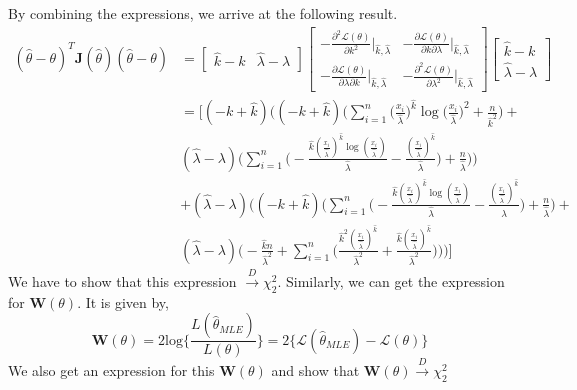 \documentclass[11pt]{article}
\begin{document}
By combining the expressions, we arrive at the following result.
\begin{equation}
  \nonumber
  \begin{aligned}
    (\hat{\theta} - \theta)^{T}\mathbf{J}(\hat{\theta})(\hat{\theta} - \theta) & = \begin{bmatrix}
      \hat{k} - k &
      \hat{\lambda} -\lambda
    \end{bmatrix}\begin{bmatrix}
      -\frac{\partial^{2} \mathcal{L}(\theta)}{\partial k^{2}} \rvert_{\hat{k}, \hat{\lambda}} & -\frac{\partial \mathcal{L}(\theta)}{\partial k \partial \lambda} \rvert_{\hat{k}, \hat{\lambda}}\\
      -\frac{\partial \mathcal{L}(\theta)}{\partial \lambda \partial k }\rvert_{\hat{k}, \hat{\lambda}} & -\frac{\partial^{2} \mathcal{L}(\theta)}{\partial \lambda^{2}}\rvert_{\hat{k}, \hat{\lambda}}
    \end{bmatrix}
    \begin{bmatrix}
      \hat{k} - k \\
      \hat{\lambda} -\lambda
    \end{bmatrix}\\
    & = \bigg[(- k + \hat{k}) ((- k + \hat{k}) \bigg(\sum_{i=1}^{n} \bigg(\frac{{x}_{i}}{\hat{\lambda}}\bigg)^{\hat{k}} \log{\bigg(\frac{{x}_{i}}{\hat{\lambda}}\bigg)}^{2} + \frac{n}{\hat{k}^{2}}\bigg) + \\
    & (\hat{\lambda} - \lambda) \bigg(\sum_{i=1}^{n}\bigg(- \frac{\hat{k} (\frac{{x}_{i}}{\hat{\lambda}})^{\hat{k}} \log{(\frac{{x}_{i}}{\hat{\lambda}} )}}{\hat{\lambda}} - \frac{(\frac{{x}_{i}}{\hat{\lambda}})^{\hat{k}}}{\hat{\lambda}}\bigg) + \frac{n}{\hat{\lambda}}\bigg)\bigg)\\
    & + (\hat{\lambda} - \lambda) ((- k + \hat{k}) \bigg(\sum_{i=1}^{n} \bigg(- \frac{\hat{k} (\frac{{x}_{i}}{\hat{\lambda}})^{\hat{k}} \log{(\frac{{x}_{i}}{\hat{\lambda}} )}}{\hat{\lambda}} - \frac{(\frac{{x}_{i}}{\hat{\lambda}})^{\hat{k}}}{\hat{\lambda}}\bigg) + \frac{n}{\hat{\lambda}}\bigg) +\\
    & (\hat{\lambda} - \lambda) \bigg(- \frac{\hat{k} n}{\hat{\lambda}^{2}} + \sum_{i=1}^{n} \bigg(\frac{\hat{k}^{2} (\frac{{x}_{i}}{\hat{\lambda}})^{\hat{k}}}{\hat{\lambda}^{2}} + \frac{\hat{k} (\frac{{x}_{i}}{\hat{\lambda}})^{\hat{k}}}{\hat{\lambda}^{2}}\bigg)\bigg)\bigg)\bigg]
  \end{aligned}
\end{equation}
We have to show that this expression $\xrightarrow{D} \chi_{2}^{2}$. Similarly, we can get the expression for $\mathbf{W}(\theta)$. It is given by,
\begin{equation}
  \nonumber
  \mathbf{W}(\theta) = 2\text{log}\bigg\{\frac{L(\hat{\theta}_{MLE})}{L(\theta)}\bigg\} = 2\bigg\{\mathcal{L}({\hat{\theta}_{MLE}}) - \mathcal{L}({\theta})\bigg\}
\end{equation}
We also get an expression for this $\mathbf{W}(\theta)$ and show that $\mathbf{W}(\theta) \xrightarrow{D} \chi_{2}^{2}$
\end{document}

